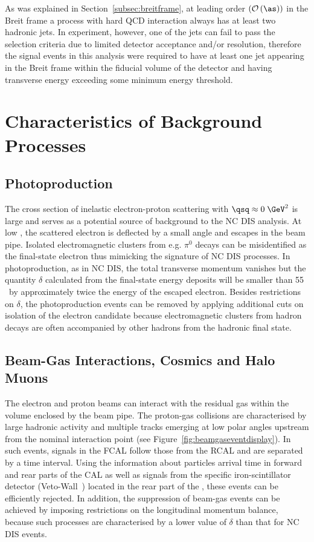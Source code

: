 As was explained in Section~\ref{subsec:breitframe}, at leading order $\left(\mathcal{O}\left(\as\right)\right)$ in the Breit frame a process with hard QCD interaction always has at least two hadronic jets. In experiment, however, one of the jets can fail to pass the selection criteria due to limited detector acceptance and/or resolution, therefore the signal events in this analysis were required to have at least one jet appearing in the Breit frame within the fiducial volume of the detector and having transverse energy exceeding some minimum energy threshold.

\section{Characteristics of Background Processes}
\label{sec:bgchar}

\subsection{Photoproduction}
\label{subsec:photoprodbg}
The cross section of inelastic electron-proton scattering with $\qsq \approx 0\;\GeV^2$ is large and serves as a potential source of background to the NC DIS analysis. At low \qsq, the scattered electron is deflected by a small angle and escapes in the beam pipe. Isolated electromagnetic clusters from e.g. $\pi^0$ decays can be misidentified as the final-state electron thus mimicking the signature of NC DIS processes. In photoproduction, as in NC DIS, the total transverse momentum vanishes but the quantity $\delta$ calculated from the final-state energy deposits will be smaller than 55 \GeV~by approximately twice the energy of the escaped electron.
Besides restrictions on $\delta$, the photoproduction events can be removed by applying additional cuts on isolation of the electron candidate because electromagnetic clusters from hadron decays are often accompanied by other hadrons from the hadronic final state.

\subsection{Beam-Gas Interactions, Cosmics and Halo Muons}
\label{subsec:beamgasfeatures}
The electron and proton beams can interact with the residual gas within the volume enclosed by the beam pipe. The proton-gas collisions are characterised by large hadronic activity and multiple tracks emerging at low polar angles upstream from the nominal interaction point (see Figure~\ref{fig:beamgaseventdisplay}). In such events, signals in the FCAL follow those from the RCAL and are separated by a time interval. Using the information about particles arrival time in forward and rear parts of the CAL as well as signals from the specific iron-scintillator detector (Veto-Wall~\cite{zeus:1993:bluebook}) located in the rear part of the \zeus, these events can be efficiently rejected. In addition, the suppression of beam-gas events can be achieved by imposing restrictions on the longitudinal momentum balance, because such processes are characterised by a lower value of $\delta$ than that for NC DIS events. 

